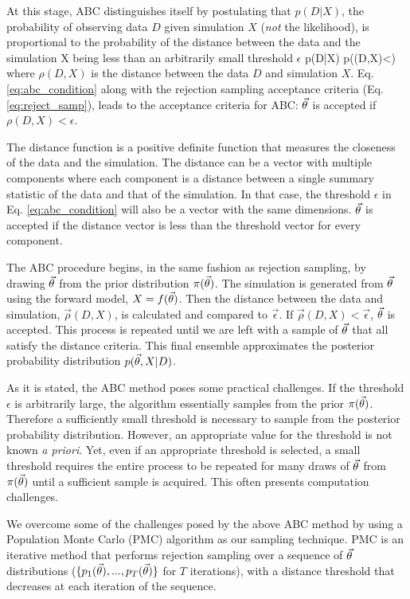 At this stage, ABC distinguishes itself by postulating that $p(D|X)$, 
the probability of observing data $D$ given simulation $X$ 
({\em not} the likelihood), is proportional to the 
probability of the distance between the data and the simulation X being less than 
an arbitrarily small threshold $\epsilon$ 
\beq
p(D|X) \propto p(\rho(D,X)<\epsilon)
\label{eq:abc_condition}
\eeq
where $\rho(D, X)$ is the distance between the data $D$ and simulation $X$. 
Eq. \ref{eq:abc_condition} along with the rejection sampling acceptance criteria 
(Eq. \ref{eq:reject_samp}), leads to the acceptance criteria for ABC: $\vec{\theta}$ is accepted if $\rho(D, X) < \epsilon$. 

The distance function is a positive definite function that measures the closeness 
of the data and the simulation. The distance can be a vector with multiple components 
where each component is a distance between a single summary statistic of the data 
and that of the simulation. In that case, the threshold $\epsilon$ in 
Eq. \ref{eq:abc_condition} will also be a vector with the same dimensions.  
$\vec{\theta}$ is accepted if the distance vector is less than the threshold vector for 
every component.

The ABC procedure begins, in the same fashion as rejection sampling, by drawing 
$\vec{\theta}$ from the prior distribution $\pi(\vec{\theta})$. The simulation is generated from 
$\vec{\theta}$ using the forward model, $X = f(\vec{\theta})$. Then the distance between 
the data and simulation, $\vec\rho(D, X)$, is calculated and compared to 
$\vec\epsilon$. If $\vec\rho(D, X) < \vec\epsilon$, $\vec{\theta}$ is accepted. 
This process is repeated until we are left with a sample of $\vec{\theta}$ that all 
satisfy the distance criteria. This final ensemble approximates the posterior 
probability distribution $p(\vec{\theta}, X|D)$. 

As it is stated, the ABC method poses some practical challenges. If the 
threshold $\epsilon$ is arbitrarily large, the algorithm essentially 
samples from the prior $\pi(\vec{\theta})$. Therefore a sufficiently small threshold
is necessary to sample from the posterior probability distribution. However,
an appropriate value for the threshold is not known \emph{a priori}. Yet, 
even if an appropriate threshold is selected, a small threshold requires 
the entire process to be repeated for many draws of $\vec{\theta}$ from $\pi(\vec{\theta})$ 
until a sufficient sample is acquired. This often presents computation challenges. 

We overcome some of the challenges posed by the above ABC method
by using a Population Monte Carlo (PMC) algorithm as our sampling technique. 
PMC is an iterative method that performs rejection sampling over a 
sequence of $\vec{\theta}$ distributions ($\{p_1(\vec{\theta}), ..., p_T(\vec{\theta})\}$ for 
$T$ iterations), with a distance threshold that decreases at each iteration of 
the sequence. 

